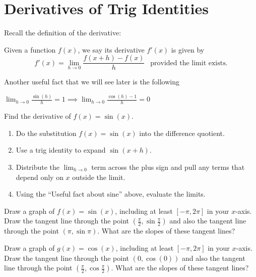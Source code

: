\documentclass[12pt, a4paper]{article}
\begin{document}
\section{Derivatives of Trig Identities}
Recall the definition of the derivative:
\begin{defi}
  Given a function \(f(x)\), we say its derivative \(f'(x)\) is given
  by \[
    f'(x) = \lim_{h \to 0} \frac{f(x+h)-f(x)}{h} \ \ \text{ provided
      the limit exists.}
  \]
\end{defi}
\vspace{-0.75in}
Another useful fact that we will see later is the following
\begin{thrm}
  \(\lim_{h \to 0} \frac{\sin(h)}{h} = 1 \implies \lim_{h \to 0}
  \frac{\cos(h)-1}{h} = 0\)
\end{thrm}
\vspace{-0.75in}
\begin{ex}
  Find the derivative of \(f(x) = \sin(x)\).
  \begin{enumerate}
  \item Do the substitution \(f(x) = \sin(x)\) into the difference
    quotient.
    \vspace{0.75in}
  \item Use a trig identity to expand \(\sin(x+h)\).
    \vspace{0.75in}
  \item Distribute the \(\lim_{h \to 0}\) term across the plus sign
    and pull any terms that depend only on \(x\) outside the limit.
    \vspace{0.75in}
  \item Using the ``Useful fact about sine'' above, evaluate the limits.
  \end{enumerate}
\end{ex}
\vspace{-1in}
\begin{ex}
  Draw a graph of \(f(x) = \sin(x)\), including at least
  \([-\pi,2\pi]\) in your \(x\)-axis. Draw the tangent line through
  the point
  \(\left(\frac{\pi}{2},\sin \frac{\pi}{2}\right)\) and also the
  tangent line through the point \(\left( \pi, \sin \pi
  \right)\). What are the slopes of these tangent lines?
\end{ex}
\begin{ex}
  Draw a graph of \(g(x) = \cos(x)\), including at least
  \([-\pi,2\pi]\) in your \(x\)-axis. Draw the tangent line through
  the point \((0, \cos(0))\) and also the tangent line through the
  point \(\left( \frac{\pi}{2}, \cos \frac{\pi}{2} \right)\). What are
  the slopes of these tangent lines?
\end{ex}
\end{document}
